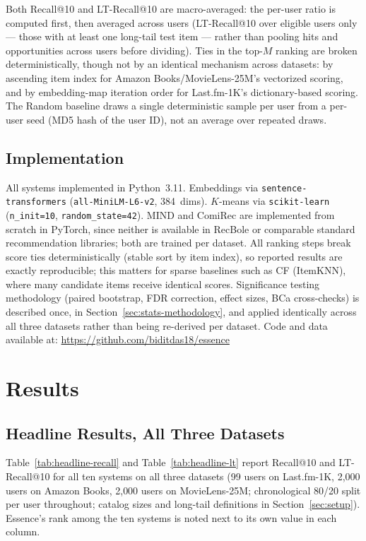 \documentclass[11pt,a4paper]{article}
\begin{document}
Both Recall@10 and LT-Recall@10 are macro-averaged: the per-user ratio is
computed first, then averaged across users (LT-Recall@10 over eligible
users only --- those with at least one long-tail test item --- rather
than pooling hits and opportunities across users before dividing). Ties
in the top-$M$ ranking are broken deterministically, though not by an
identical mechanism across datasets: by ascending item index for Amazon
Books/MovieLens-25M's vectorized scoring, and by embedding-map iteration
order for Last.fm-1K's dictionary-based scoring. The Random baseline
draws a single deterministic sample per user from a per-user seed (MD5
hash of the user ID), not an average over repeated draws.

\subsection{Implementation}
All systems implemented in Python~3.11. Embeddings via
\texttt{sentence-\allowbreak transformers} (\texttt{all-\allowbreak MiniLM-\allowbreak L6-\allowbreak v2}, 384~dims).
$K$-means via \texttt{scikit-learn} (\texttt{n\_init=10},
\texttt{random\_state=42}). MIND and ComiRec are implemented from scratch
in PyTorch, since neither is available in RecBole or comparable standard
recommendation libraries; both are trained per dataset.
All ranking steps break score ties deterministically (stable sort by item
index), so reported results are exactly reproducible; this matters for sparse
baselines such as CF (ItemKNN), where many candidate items receive identical
scores.
Significance testing methodology (paired bootstrap, FDR correction, effect
sizes, BCa cross-checks) is described once, in
Section~\ref{sec:stats-methodology}, and applied identically across all
three datasets rather than being re-derived per dataset.
Code and data available at:
\url{https://github.com/biditdas18/essence}

\section{Results}
\label{sec:results}

\subsection{Headline Results, All Three Datasets}
\label{sec:headline}

Table~\ref{tab:headline-recall} and Table~\ref{tab:headline-lt} report
Recall@10 and LT-Recall@10 for all ten systems on all three datasets (99
users on Last.fm-1K, 2{,}000 users on Amazon Books, 2{,}000 users on
MovieLens-25M; chronological 80/20 split per user throughout; catalog
sizes and long-tail definitions in Section~\ref{sec:setup}). Essence's
rank among the ten systems is noted next to its own value in each column.
\end{document}

